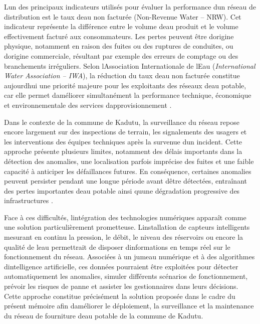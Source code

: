 \documentclass[12pt,a4paper,oneside]{report}
\begin{document}
L\textquotesingle un des principaux indicateurs utilisés pour évaluer la
performance d\textquotesingle un réseau de distribution est le taux
d\textquotesingle eau non facturée (Non-Revenue Water -- NRW). Cet
indicateur représente la différence entre le volume
d\textquotesingle eau produit et le volume effectivement facturé aux
consommateurs. Les pertes peuvent être d\textquotesingle origine
physique, notamment en raison des fuites ou des ruptures de conduites,
ou d\textquotesingle origine commerciale, résultant par exemple des
erreurs de comptage ou des branchements irréguliers. Selon
l\textquotesingle Association Internationale de l\textquotesingle Eau
(\emph{International Water Association -- IWA}), la réduction du taux
d\textquotesingle eau non facturée constitue aujourd\textquotesingle hui
une priorité majeure pour les exploitants des réseaux
d\textquotesingle eau potable, car elle permet
d\textquotesingle améliorer simultanément la performance technique,
économique et environnementale des services
d\textquotesingle approvisionnement \cite{ref11}.

Dans le contexte de la commune de Kadutu, la surveillance du réseau
repose encore largement sur des inspections de terrain, les signalements
des usagers et les interventions des équipes techniques après la
survenue d\textquotesingle un incident. Cette approche présente
plusieurs limites, notamment des délais importants dans la détection des
anomalies, une localisation parfois imprécise des fuites et une faible
capacité à anticiper les défaillances futures. En conséquence, certaines
anomalies peuvent persister pendant une longue période avant
d\textquotesingle être détectées, entraînant des pertes importantes
d\textquotesingle eau potable ainsi qu\textquotesingle une dégradation
progressive des infrastructures \cite{ref20}.

Face à ces difficultés, l\textquotesingle intégration des technologies
numériques apparaît comme une solution particulièrement prometteuse.
L\textquotesingle installation de capteurs intelligents mesurant en
continu la pression, le débit, le niveau des réservoirs ou encore la
qualité de l\textquotesingle eau permettrait de disposer
d\textquotesingle informations en temps réel sur le fonctionnement du
réseau. Associées à un jumeau numérique et à des algorithmes
d\textquotesingle intelligence artificielle, ces données pourraient être
exploitées pour détecter automatiquement les anomalies, simuler
différents scénarios de fonctionnement, prévoir les risques de panne et
assister les gestionnaires dans leurs décisions. Cette approche
constitue précisément la solution proposée dans le cadre du présent
mémoire afin d\textquotesingle améliorer le déploiement, la surveillance
et la maintenance du réseau de fourniture d\textquotesingle eau potable
de la commune de Kadutu.
\end{document}
